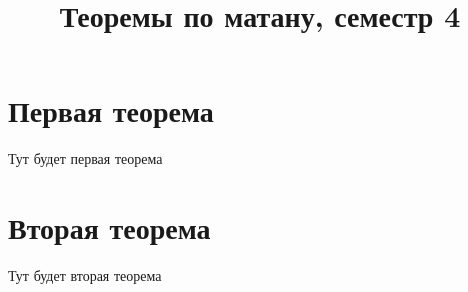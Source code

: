 \documentclass[paper=a4, fontsize=11pt]{article}
\title{Теоремы по матану, семестр 4}
\begin{document}
\maketitle
\tableofcontents
\newpage

\section{Первая теорема}
Тут будет первая теорема

\section{Вторая теорема}
Тут будет вторая теорема
\end{document}
